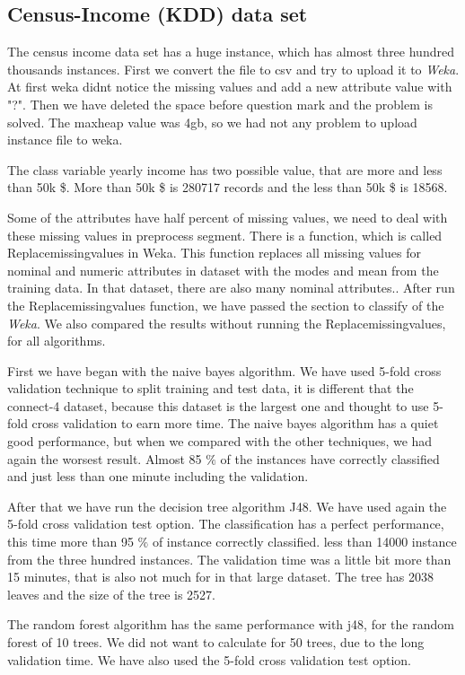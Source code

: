 \documentclass[a4paper]{article}
\begin{document}
\subsection{Census-Income (KDD) data set}

The census income data set has a huge instance, which has almost three hundred
thousands  instances. First we convert the file to csv and try to upload it to
\emph{Weka}. At first weka didnt notice the missing values and add a new
attribute value with "?". Then we have deleted the space before question mark
and the problem is solved. The maxheap value was 4gb, so we had not any problem
to upload instance file to weka. 

The class variable yearly income has two possible value, that are more and less
than 50k \$. More than 50k \$ is 280717 records and the less than 50k \$ is
18568. 

Some of the attributes have half percent of missing values, we need to deal
with these missing values in preprocess segment. There is a function, which is
called Replacemissingvalues in Weka. This function replaces all missing values
for nominal and numeric attributes in dataset with the modes and mean from the
training data. In that dataset, there are also many nominal attributes.. After
run the Replacemissingvalues function, we have passed the section to classify
of the \emph{Weka}.  We also compared the results without running the Replacemissingvalues, for all algorithms.

First we have began with the naive bayes algorithm.  We have used 5-fold cross validation technique to split training and test data, it is different that the connect-4 dataset, because this dataset is the largest one and thought to use 5-fold cross validation to earn more time. The naive bayes algorithm has a quiet good performance, but when we compared with the other techniques, we had again the worsest result. Almost 85 $\%$ of the instances have correctly classified and just less than one minute including the validation.

After that we have run the decision tree algorithm J48. We have used again the 5-fold cross validation test option. The classification has a perfect performance, this time more than 95 $\%$ of instance correctly classified. less than 14000 instance from the three hundred instances. The validation time was a little bit more than 15 minutes, that is also not much for in that large dataset. The tree has 2038 leaves and the size of the tree is 2527. 

The random forest algorithm has the same performance with j48, for the random forest of 10 trees. We did not want to calculate for 50 trees, due to the long validation time. We have also used the 5-fold cross validation test option. 
\end{document}
